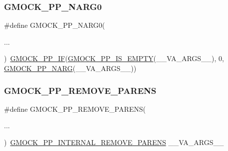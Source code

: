 \subsubsection{\texorpdfstring{GMOCK\_PP\_NARG0}{GMOCK\_PP\_NARG0}}
{\footnotesize\ttfamily \#define G\+M\+O\+C\+K\+\_\+\+P\+P\+\_\+\+N\+A\+R\+G0(\begin{DoxyParamCaption}\item[{}]{... }\end{DoxyParamCaption})~\mbox{\hyperlink{_obj__test_2lib_2googletest-master_2googlemock_2include_2gmock_2internal_2gmock-pp_8h_a82f153fedbaf56bf71b8272bdf672875}{G\+M\+O\+C\+K\+\_\+\+P\+P\+\_\+\+IF}}(\mbox{\hyperlink{_obj__test_2lib_2googletest-master_2googlemock_2include_2gmock_2internal_2gmock-pp_8h_a14eb10c5cc7380d072cd748661140f45}{G\+M\+O\+C\+K\+\_\+\+P\+P\+\_\+\+I\+S\+\_\+\+E\+M\+P\+TY}}(\+\_\+\+\_\+\+V\+A\+\_\+\+A\+R\+G\+S\+\_\+\+\_\+), 0, \mbox{\hyperlink{_obj__test_2lib_2googletest-master_2googlemock_2include_2gmock_2internal_2gmock-pp_8h_a9db18220b88597a07704bc7cf3b13304}{G\+M\+O\+C\+K\+\_\+\+P\+P\+\_\+\+N\+A\+RG}}(\+\_\+\+\_\+\+V\+A\+\_\+\+A\+R\+G\+S\+\_\+\+\_\+))}

\mbox{\label{googletest-master_2googlemock_2include_2gmock_2internal_2gmock-pp_8h_a56df0c468739cd6319be90b805a6d5b0}} 
\subsubsection{\texorpdfstring{GMOCK\_PP\_REMOVE\_PARENS}{GMOCK\_PP\_REMOVE\_PARENS}}
{\footnotesize\ttfamily \#define G\+M\+O\+C\+K\+\_\+\+P\+P\+\_\+\+R\+E\+M\+O\+V\+E\+\_\+\+P\+A\+R\+E\+NS(\begin{DoxyParamCaption}\item[{}]{... }\end{DoxyParamCaption})~\mbox{\hyperlink{_obj__test_2lib_2googletest-master_2googlemock_2include_2gmock_2internal_2gmock-pp_8h_ac3c1fba05dad44080330c0ecd1208ca6}{G\+M\+O\+C\+K\+\_\+\+P\+P\+\_\+\+I\+N\+T\+E\+R\+N\+A\+L\+\_\+\+R\+E\+M\+O\+V\+E\+\_\+\+P\+A\+R\+E\+NS}} \+\_\+\+\_\+\+V\+A\+\_\+\+A\+R\+G\+S\+\_\+\+\_\+}

\mbox{\label{googletest-master_2googlemock_2include_2gmock_2internal_2gmock-pp_8h_ab2a0d358d2eb3f04395d0494ab7aab01}} 
